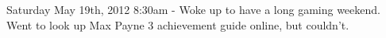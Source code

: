 Saturday May 19th, 2012
8:30am - Woke up to have a long gaming weekend. Went to look up Max
Payne 3 achievement guide online, but couldn't.
